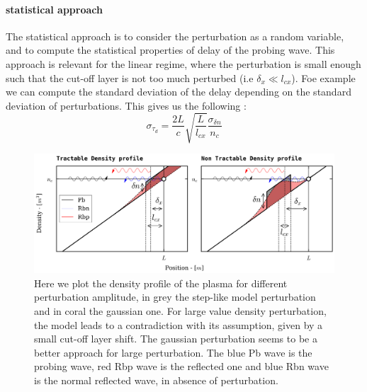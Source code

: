 \documentclass[11pt,a4paper]{report}
\begin{document}
\begin{multicols}{2}
    \paragraph{statistical approach}
    The statistical approach is to consider the perturbation as a random variable, and to compute the statistical properties of delay of the probing wave. This approach is relevant for the linear regime, where the perturbation is small enough such that the cut-off layer is not too much perturbed (i.e $\delta_x \ll l_{cx}$). Foe example we can compute the standard deviation of the delay depending on the standard deviation of perturbations.
    This gives us the following :
    $$\sigma_{\tau_d} = \frac{2L}{c}\sqrt{\frac{L}{l_{cx}}}\frac{\sigma_{\delta n}}{n_c}$$
\end{multicols}

\begin{figure}[H]
    \centering
    \includegraphics[width = 1\linewidth]{./figures/density_profile.png}
    \caption{Here we plot the density profile of the plasma for different perturbation amplitude, in grey the step-like model perturbation and in coral the gaussian one. For large value density perturbation, the model leads to a contradiction with its assumption, given by a small cut-off layer shift.
        The gaussian perturbation seems to be a better approach for large perturbation. The blue Pb wave is the probing wave, red Rbp wave is the reflected one and blue Rbn wave is the normal reflected wave, in absence of perturbation.}
    \label{}
\end{figure}
\end{document}
